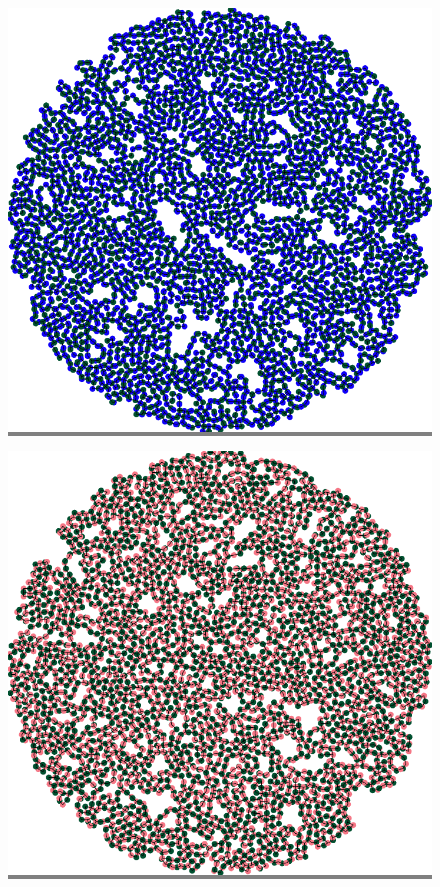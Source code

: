 \documentclass{article}
\begin{document}
\begin{figure}
\begin{minipage}{0.3\textwidth}
    \end{minipage}
    \hspace{\fill}
    \begin{minipage}{0.3\textwidth}
    \colorbox{gray}{\includegraphics[width=\linewidth]{./images/disk_1_bb_0.png}}
    \end{minipage}
    \hspace{\fill}
    \begin{minipage}{0.3\textwidth}
    \colorbox{gray}{\includegraphics[width=\linewidth]{./images/disk_1_bb_1.png}}

\end{minipage}
\end{figure}
\end{document}
